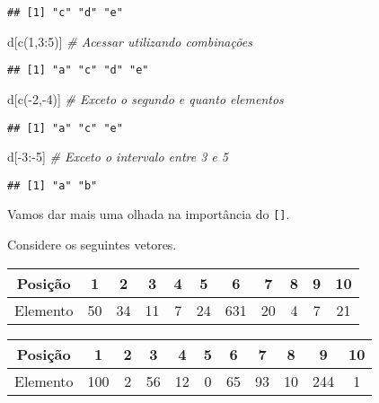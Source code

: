 \documentclass[
]{book}
\newenvironment{Shaded}{\begin{snugshade}}{\end{snugshade}}
\newcommand{\CommentTok}[1]{\textcolor[rgb]{0.56,0.35,0.01}{\textit{#1}}}
\newcommand{\DecValTok}[1]{\textcolor[rgb]{0.00,0.00,0.81}{#1}}
\newcommand{\FunctionTok}[1]{\textcolor[rgb]{0.00,0.00,0.00}{#1}}
\newcommand{\NormalTok}[1]{#1}
\newcommand{\SpecialCharTok}[1]{\textcolor[rgb]{0.00,0.00,0.00}{#1}}
\begin{document}
\begin{verbatim}
## [1] "c" "d" "e"
\end{verbatim}

\begin{Shaded}
\begin{Highlighting}[]
\NormalTok{d[}\FunctionTok{c}\NormalTok{(}\DecValTok{1}\NormalTok{,}\DecValTok{3}\SpecialCharTok{:}\DecValTok{5}\NormalTok{)] }\CommentTok{\# Acessar utilizando combinações}
\end{Highlighting}
\end{Shaded}

\begin{verbatim}
## [1] "a" "c" "d" "e"
\end{verbatim}

\begin{Shaded}
\begin{Highlighting}[]
\NormalTok{d[}\FunctionTok{c}\NormalTok{(}\SpecialCharTok{{-}}\DecValTok{2}\NormalTok{,}\SpecialCharTok{{-}}\DecValTok{4}\NormalTok{)] }\CommentTok{\# Exceto o segundo e quanto elementos}
\end{Highlighting}
\end{Shaded}

\begin{verbatim}
## [1] "a" "c" "e"
\end{verbatim}

\begin{Shaded}
\begin{Highlighting}[]
\NormalTok{d[}\SpecialCharTok{{-}}\DecValTok{3}\SpecialCharTok{:{-}}\DecValTok{5}\NormalTok{] }\CommentTok{\# Exceto o intervalo entre 3 e 5}
\end{Highlighting}
\end{Shaded}

\begin{verbatim}
## [1] "a" "b"
\end{verbatim}

Vamos dar mais uma olhada na importância do \texttt{{[}{]}}.

Considere os seguintes vetores.

\begin{longtable}[]{@{}ccccccccccc@{}}
\toprule
Posição & 1 & 2 & 3 & 4 & 5 & 6 & 7 & 8 & 9 & 10 \\
\midrule
\endhead
Elemento & 50 & 34 & 11 & 7 & 24 & 631 & 20 & 4 & 7 & 21 \\
\bottomrule
\end{longtable}

\begin{longtable}[]{@{}ccccccccccc@{}}
\toprule
Posição & 1 & 2 & 3 & 4 & 5 & 6 & 7 & 8 & 9 & 10 \\
\midrule
\endhead
Elemento & 100 & 2 & 56 & 12 & 0 & 65 & 93 & 10 & 244 & 1 \\
\bottomrule
\end{longtable}
\end{document}
